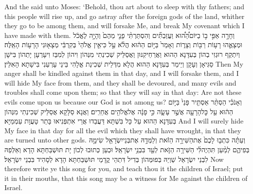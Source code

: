 {And the \lord\space said unto Moses: ‘Behold, thou art about to sleep with thy fathers; and this people will rise up, and go astray after the foreign gods of the land, whither they go to be among them, and will forsake Me, and break My covenant which I have made with them.}{}
{וְחָרָ֣ה אַפִּ֣י ב֣וֹ בַיּוֹם\maqqaf הַ֠ה֠וּא וַעֲזַבְתִּ֞ים וְהִסְתַּרְתִּ֨י פָנַ֤י מֵהֶם֙ וְהָיָ֣ה לֶאֱכֹ֔ל וּמְצָאֻ֛הוּ רָע֥וֹת רַבּ֖וֹת וְצָר֑וֹת וְאָמַר֙ בַּיּ֣וֹם הַה֔וּא הֲלֹ֗א עַ֣ל כִּי\maqqaf אֵ֤ין אֱלֹהַי֙ בְּקִרְבִּ֔י מְצָא֖וּנִי הָרָע֥וֹת הָאֵֽלֶּה׃}
{וְיִתְקַף רוּגְזִי בְהוֹן בְּעִדָּנָא הַהוּא וַאֲרַחֵיקִנּוּן וַאֲסַלֵּיק שְׁכִינְתִי מִנְּהוֹן וִיהוֹן לְמִבַּז וִיעָרְעָן יָתְהוֹן בִּישָׁן סַגִּיאָן וְעָקָן וְיֵימַר בְּעִדָּנָא הַהוּא הֲלָא מִדְּלֵית שְׁכִינַת אֱלָהִי בֵּינַי עָרְעַנִי בִּישָׁתָא הָאִלֵּין׃}
{Then My anger shall be kindled against them in that day, and I will forsake them, and I will hide My face from them, and they shall be devoured, and many evils and troubles shall come upon them; so that they will say in that day: Are not these evils come upon us because our God is not among us?}{}
{וְאָנֹכִ֗י הַסְתֵּ֨ר אַסְתִּ֤יר פָּנַי֙ בַּיּ֣וֹם הַה֔וּא עַ֥ל כׇּל\maqqaf הָרָעָ֖ה אֲשֶׁ֣ר עָשָׂ֑ה כִּ֣י פָנָ֔ה אֶל\maqqaf אֱלֹהִ֖ים אֲחֵרִֽים׃}
{וַאֲנָא סַלָּקָא אֲסַלֵּיק שְׁכִינְתִי מִנְּהוֹן בְּעִדָּנָא הַהוּא עַל כָּל בִּשְׁתָּא דַּעֲבַדוּ אֲרֵי אִתְפְּנִיאוּ בָּתַר טָעֲוָת עַמְמַיָּא׃}
{And I will surely hide My face in that day for all the evil which they shall have wrought, in that they are turned unto other gods.}{}
{וְעַתָּ֗ה כִּתְב֤וּ לָכֶם֙ אֶת\maqqaf הַשִּׁירָ֣ה הַזֹּ֔את וְלַמְּדָ֥הּ אֶת\maqqaf בְּנֵי\maqqaf יִשְׂרָאֵ֖ל שִׂימָ֣הּ בְּפִיהֶ֑ם לְמַ֨עַן תִּהְיֶה\maqqaf לִּ֜י הַשִּׁירָ֥ה הַזֹּ֛את לְעֵ֖ד בִּבְנֵ֥י יִשְׂרָאֵֽל׃}
{וּכְעַן כְּתוּבוּ לְכוֹן יָת תּוּשְׁבַּחְתָּא הָדָא וְאַלְּפַהּ לִבְנֵי יִשְׂרָאֵל שַׁוְיַהּ בְּפוּמְּהוֹן בְּדִיל דִּתְהֵי קֳדָמַי תּוּשְׁבַּחְתָּא הָדָא לְסָהִיד בִּבְנֵי יִשְׂרָאֵל׃}
{Now therefore write ye this song for you, and teach thou it the children of Israel; put it in their mouths, that this song may be a witness for Me against the children of Israel.}{}
